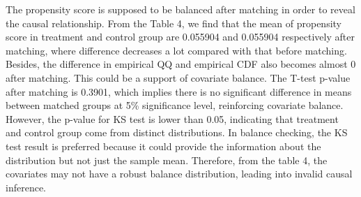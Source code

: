 \documentclass{article}[12pt]
\begin{document}
The propensity score is supposed to be balanced after matching in order to reveal the causal relationship. From the Table 4, we find that the mean of propensity score in treatment and control group are 0.055904 and 0.055904 respectively after matching, where difference decreases a lot compared with that before matching. Besides, the difference in empirical QQ and empirical CDF also becomes almost 0 after matching. This could be a support of covariate balance. The T-test p-value after matching is 0.3901, which implies there is no significant difference in means between matched groups at 5\% significance level, reinforcing covariate balance. However, the p-value for KS test is lower than 0.05, indicating that treatment and control group come from distinct distributions. In balance checking, the KS test result is preferred because it could provide the information about the distribution but not just the sample mean. Therefore, from the table 4, the covariates may not have a robust balance distribution, leading into invalid causal inference.
\par
\end{document}
